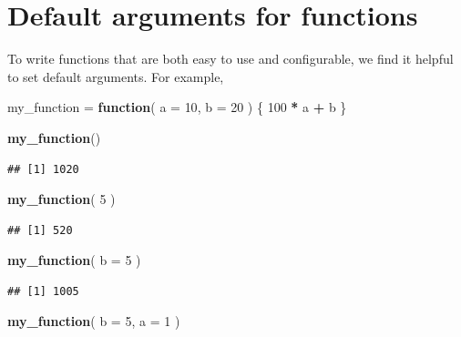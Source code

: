 \documentclass[
]{book}
\newenvironment{Shaded}{\begin{snugshade}}{\end{snugshade}}
\newcommand{\AttributeTok}[1]{\textcolor[rgb]{0.13,0.29,0.53}{#1}}
\newcommand{\ControlFlowTok}[1]{\textcolor[rgb]{0.13,0.29,0.53}{\textbf{#1}}}
\newcommand{\DecValTok}[1]{\textcolor[rgb]{0.00,0.00,0.81}{#1}}
\newcommand{\FunctionTok}[1]{\textcolor[rgb]{0.13,0.29,0.53}{\textbf{#1}}}
\newcommand{\NormalTok}[1]{#1}
\newcommand{\OtherTok}[1]{\textcolor[rgb]{0.56,0.35,0.01}{#1}}
\newcommand{\SpecialCharTok}[1]{\textcolor[rgb]{0.81,0.36,0.00}{\textbf{#1}}}
\begin{document}
\section{Default arguments for functions}\label{default-arguments}

To write functions that are both easy to use and configurable, we find it helpful to set default arguments.
For example,

\begin{Shaded}
\begin{Highlighting}[]
\NormalTok{my\_function }\OtherTok{=} \ControlFlowTok{function}\NormalTok{( }\AttributeTok{a =} \DecValTok{10}\NormalTok{, }\AttributeTok{b =} \DecValTok{20}\NormalTok{ ) \{}
     \DecValTok{100} \SpecialCharTok{*}\NormalTok{ a }\SpecialCharTok{+}\NormalTok{ b}
\NormalTok{\}}

\FunctionTok{my\_function}\NormalTok{()}
\end{Highlighting}
\end{Shaded}

\begin{verbatim}
## [1] 1020
\end{verbatim}

\begin{Shaded}
\begin{Highlighting}[]
\FunctionTok{my\_function}\NormalTok{( }\DecValTok{5}\NormalTok{ )}
\end{Highlighting}
\end{Shaded}

\begin{verbatim}
## [1] 520
\end{verbatim}

\begin{Shaded}
\begin{Highlighting}[]
\FunctionTok{my\_function}\NormalTok{( }\AttributeTok{b =} \DecValTok{5}\NormalTok{ )}
\end{Highlighting}
\end{Shaded}

\begin{verbatim}
## [1] 1005
\end{verbatim}

\begin{Shaded}
\begin{Highlighting}[]
\FunctionTok{my\_function}\NormalTok{( }\AttributeTok{b =} \DecValTok{5}\NormalTok{, }\AttributeTok{a =} \DecValTok{1}\NormalTok{ )}
\end{Highlighting}
\end{Shaded}
\end{document}
